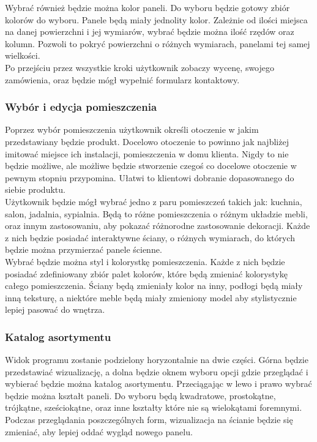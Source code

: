 \documentclass{article} %
\begin{document}
        Wybrać również będzie można kolor paneli. Do wyboru będzie gotowy zbiór kolorów do wyboru. Panele będą miały jednolity kolor. Zależnie od ilości miejsca na danej powierzchni i jej wymiarów, wybrać będzie można ilość rzędów oraz kolumn. Pozwoli to pokryć powierzchni o różnych wymiarach, panelami tej samej wielkości.
        \\
        
        Po przejściu przez wszystkie kroki użytkownik zobaczy wycenę, swojego zamówienia, oraz będzie mógł wypełnić formularz kontaktowy.
        \\
    
        \subsubsection{Wybór i edycja pomieszczenia}
        Poprzez wybór pomieszczenia użytkownik określi otoczenie w jakim przedstawiany będzie produkt. Docelowo otoczenie to powinno jak najbliżej imitować miejsce ich instalacji, pomieszczenia w domu klienta. Nigdy to nie będzie możliwe, ale możliwe będzie stworzenie czegoś co docelowe otoczenie w pewnym stopniu przypomina. Ułatwi to klientowi dobranie dopasowanego do siebie produktu.
        \\
        
        Użytkownik będzie mógł wybrać jedno z paru pomieszczeń takich jak: kuchnia, salon, jadalnia, sypialnia. Będą to różne pomieszczenia o różnym układzie mebli, oraz innym zastosowaniu, aby pokazać różnorodne zastosowanie dekoracji. Każde z nich będzie posiadać interaktywne ściany, o różnych wymiarach, do których będzie można przymierzać panele ścienne.
        \\
        
        Wybrać będzie można styl i kolorystkę pomieszczenia. Każde z nich będzie posiadać zdefiniowany zbiór palet kolorów, które będą zmieniać kolorystykę całego pomieszczenia. Ściany będą zmieniały kolor na inny, podłogi będą miały inną teksturę, a niektóre meble będą miały zmieniony model aby stylistycznie lepiej pasować do wnętrza.
        \\
        
        \subsubsection{Katalog asortymentu}
        Widok programu zostanie podzielony horyzontalnie na dwie części. Górna będzie przedstawiać wizualizację, a dolna będzie oknem wyboru opcji gdzie przeglądać i wybierać będzie można katalog asortymentu. Przeciągając w lewo i prawo wybrać będzie można kształt paneli. Do wyboru będą kwadratowe, prostokątne, trójkątne, sześciokątne, oraz inne kształty które nie są wielokątami foremnymi. Podczas przeglądania poszczególnych form, wizualizacja na ścianie będzie się zmieniać, aby lepiej oddać wygląd nowego panelu.
        \\
        
\end{document}
